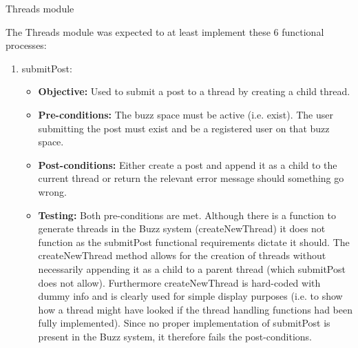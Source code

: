 \item Threads module
	
The Threads module was expected to at least implement these 6 functional processes:
	
\begin{enumerate}
\item submitPost:
	\begin{itemize}
		\item\textbf{Objective: } Used to submit a post to a thread by creating a child thread.
		\item\textbf{Pre-conditions: } The buzz space must be active (i.e. exist). The user submitting the post must exist and be a registered user on that buzz space. 
		\item\textbf{Post-conditions: } Either create a post and append it as a child to the current thread or return the relevant error message should something go wrong.
		\item\textbf{Testing: } Both pre-conditions are met. Although there is a function to generate threads in the Buzz system (createNewThread) it does not function as the submitPost functional requirements dictate it should. The createNewThread method allows for the creation of threads without necessarily appending it as a child to a parent thread (which submitPost does not allow). Furthermore createNewThread is hard-coded with dummy info and is clearly used for simple display purposes (i.e. to show how a thread might have looked if the thread handling functions had been fully implemented). Since no proper implementation of submitPost is present in the Buzz system, it therefore fails the post-conditions.


\end{itemize}
\end{enumerate}
